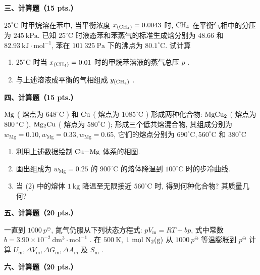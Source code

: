 \vspace{0.5cm}
\noindent\textbf{三、计算题（15 pts.）}

$25^\circ\mathrm{C}$ 时甲烷溶在苯中, 当平衡浓度 $x_{\ce{(CH_{4})}} = 0.0043$ 时, $\ce{CH_{4}}$ 在平衡气相中的分压为 $245\ \mathrm{kPa}$. 已知 $25^\circ\mathrm{C}$ 时液态苯和苯蒸气的标准生成焓分别为 $48.66$ 和 $82.93\ \mathrm{kJ\cdot mol^{-1}}$, 苯在 $101\ 325\ \mathrm{Pa}$ 下的沸点为 $80.1^\circ\mathrm{C}$. 试计算
\begin{enumerate}[label=(\arabic*), itemsep=1ex]
    \item $25^\circ\mathrm{C}$ 时当 $x_{\ce{(CH_{4})}} = 0.01$ 时的甲烷苯溶液的蒸气总压 $p$ .
    \item 与上述溶液成平衡的气相组成 $y_{\ce{(CH_{4})}}$ .
\end{enumerate}

\vspace{0.5cm}
\noindent\textbf{四、计算题（15 pts.）}

$\ce{Mg}$ ( 熔点为 $648^\circ\mathrm{C}$ ) 和 $\ce{Cu}$ ( 熔点为 $1085^\circ\mathrm{C}$ ) 形成两种化合物: $\ce{MgCu_{2}}$ ( 熔点为 $800\ ^\circ\mathrm{C}$ ), $\ce{Mg_{2}Cu}$ ( 熔点为 $580^\circ\mathrm{C}$ ); 形成三个低共熔混合物, 其组成分别为 $w_\mathrm{Mg} = 0.10, w_\mathrm{Mg} = 0.33, w_\mathrm{Mg} = 0.65$, 它们的熔点分别为 $690^\circ\mathrm{C}, 560^\circ\mathrm{C}$ 和 $380^\circ\mathrm{C}$ 
\begin{enumerate}[label=(\arabic*), itemsep=1ex]
    \item 利用上述数据绘制 $\ce{Cu-Mg}$ 体系的相图.
    \item 画出组成为 $w_\mathrm{Mg} = 0.25$ 的 $900^\circ\mathrm{C}$ 的熔体降温到 $100^\circ\mathrm{C}$ 时的步冷曲线.
    \item 当 (2) 中的熔体 $1\ \mathrm{kg}$ 降温至无限接近 $560^\circ\mathrm{C}$ 时, 得到何种化合物? 其质量几何?
\end{enumerate}

\vspace{0.5cm}
\noindent\textbf{五、计算题（20 pts.）}

一直到 $1000\ p^\ominus$, 氮气仍服从下列状态方程式: $pV_\mathrm{m} = RT + bp$, 式中常数 $b = 3.90\times10^{-2}\ \mathrm{dm^3\cdot mol^{-1}}$ . 在 $500\ \mathrm{K}$, $1\ \mathrm{mol}\ \ce{N_{2}(g)}$ 从 $1000\ p^\ominus$ 等温膨胀到 $p^\ominus$ 计算 $U_\mathrm{m}, \Delta V_\mathrm{m}, \Delta G_\mathrm{m}, \Delta A_\mathrm{m}$ 及 $S_\mathrm{m}$ .

\vspace{0.5cm}
\noindent\textbf{六、计算题（20 pts.）}

